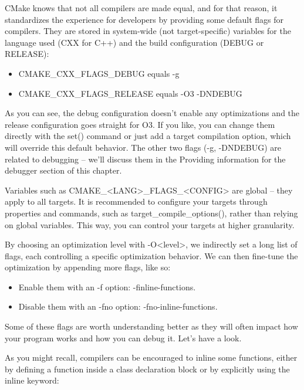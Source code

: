 CMake knows that not all compilers are made equal, and for that reason, it standardizes the experience for developers by providing some default flags for compilers. They are stored in system-wide (not target-specific) variables for the language used (CXX for C++) and the build configuration (DEBUG or RELEASE):

\begin{itemize}
\item
CMAKE\_CXX\_FLAGS\_DEBUG equals -g

\item
CMAKE\_CXX\_FLAGS\_RELEASE equals -O3 -DNDEBUG
\end{itemize}

As you can see, the debug configuration doesn’t enable any optimizations and the release configuration goes straight for O3. If you like, you can change them directly with the set() command or just add a target compilation option, which will override this default behavior. The other two flags (-g, -DNDEBUG) are related to debugging – we’ll discuss them in the Providing information for the debugger section of this chapter.

Variables such as CMAKE\_<LANG>\_FLAGS\_<CONFIG> are global – they apply to all targets. It is recommended to configure your targets through properties and commands, such as target\_compile\_options(), rather than relying on global variables. This way, you can control your targets at higher granularity.

By choosing an optimization level with -O<level>, we indirectly set a long list of flags, each controlling a specific optimization behavior. We can then fine-tune the optimization by appending more flags, like so:

\begin{itemize}
\item
Enable them with an -f option: -finline-functions.

\item
Disable them with an -fno option: -fno-inline-functions.
\end{itemize}

Some of these flags are worth understanding better as they will often impact how your program works and how you can debug it. Let’s have a look.


As you might recall, compilers can be encouraged to inline some functions, either by defining a function inside a class declaration block or by explicitly using the inline keyword:

